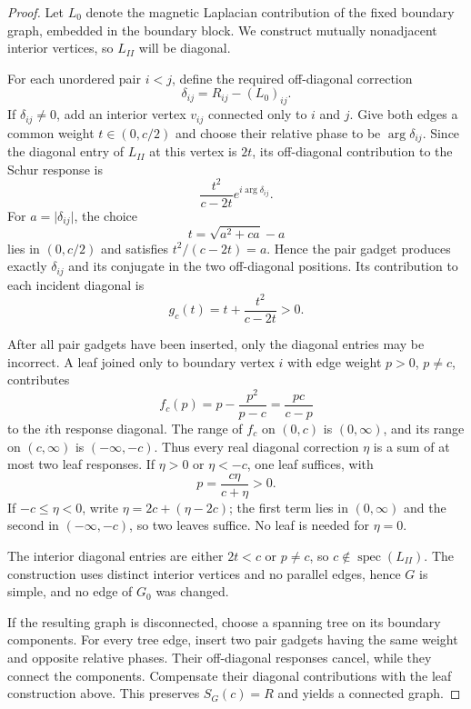 \documentclass[11pt]{article}
\numberwithin{equation}{section}
\theoremstyle{definition}
\theoremstyle{remark}
\newcommand{\spec}{\operatorname{spec}}
\begin{document}
\begin{proof}
Let $L_0$ denote the magnetic Laplacian contribution of the fixed boundary
graph, embedded in the boundary block.  We construct mutually nonadjacent
interior vertices, so $L_{II}$ will be diagonal.

For each unordered pair $i<j$, define the required off-diagonal correction
\begin{equation}
  \delta_{ij}=R_{ij}-(L_0)_{ij}.
\end{equation}
If $\delta_{ij}\ne0$, add an interior vertex $v_{ij}$ connected only to $i$ and
$j$.  Give both edges a common weight $t\in(0,c/2)$ and choose their relative
phase to be $\arg\delta_{ij}$.  Since the diagonal entry of $L_{II}$ at this
vertex is $2t$, its off-diagonal contribution to the Schur response is
\begin{equation}
  \frac{t^2}{c-2t}e^{i\arg\delta_{ij}}.
  \label{eq:pair-response}
\end{equation}
For $a=\lvert\delta_{ij}\rvert$, the choice
\begin{equation}
  t=\sqrt{a^2+ca}-a
  \label{eq:pair-weight}
\end{equation}
lies in $(0,c/2)$ and satisfies $t^2/(c-2t)=a$.  Hence the pair gadget produces
exactly $\delta_{ij}$ and its conjugate in the two off-diagonal positions.  Its
contribution to each incident diagonal is
\begin{equation}
  g_c(t)=t+\frac{t^2}{c-2t}>0.
  \label{eq:pair-diagonal}
\end{equation}

After all pair gadgets have been inserted, only the diagonal entries may be
incorrect.  A leaf joined only to boundary vertex $i$ with edge weight
$p>0$, $p\ne c$, contributes
\begin{equation}
  f_c(p)=p-\frac{p^2}{p-c}=\frac{pc}{c-p}
  \label{eq:leaf-response}
\end{equation}
to the $i$th response diagonal.  The range of $f_c$ on $(0,c)$ is
$(0,\infty)$, and its range on $(c,\infty)$ is $(-\infty,-c)$.  Thus every
real diagonal correction $\eta$ is a sum of at most two leaf responses.  If
$\eta>0$ or $\eta<-c$, one leaf suffices, with
\begin{equation}
  p=\frac{c\eta}{c+\eta}>0.
\end{equation}
If $-c\leq\eta<0$, write $\eta=2c+(\eta-2c)$; the first term lies in
$(0,\infty)$ and the second in $(-\infty,-c)$, so two leaves suffice.  No leaf
is needed for $\eta=0$.

The interior diagonal entries are either $2t<c$ or $p\ne c$, so
$c\notin\spec(L_{II})$.  The construction uses distinct interior vertices and
no parallel edges, hence $G$ is simple, and no edge of $G_0$ was changed.

If the resulting graph is disconnected, choose a spanning tree on its boundary
components.  For every tree edge, insert two pair gadgets having the same
weight and opposite relative phases.  Their off-diagonal responses cancel,
while they connect the components.  Compensate their diagonal contributions
with the leaf construction above.  This preserves $S_G(c)=R$ and yields a
connected graph.
\end{proof}
\end{document}
